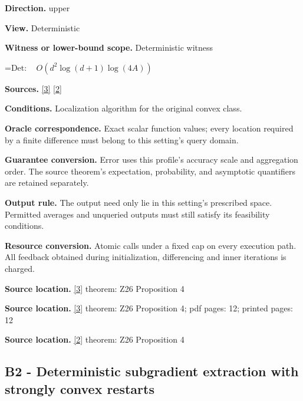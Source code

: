 \documentclass[10pt,a4paper]{article}
\newcommand{\AtlasMath}[1]{\par\begingroup\centering\setbox0=\hbox{$\displaystyle #1$}\ifdim\wd0>1.4\linewidth\typeout{ATLAS WIDE FORMULA: \the\wd0}\fi\ifdim\wd0>\linewidth\resizebox{\linewidth}{!}{\box0}\else\box0\fi\par\endgroup}
\begin{document}
\textbf{Direction.} upper



\textbf{View.} Deterministic



\textbf{Witness or lower-bound scope.} Deterministic witness



\AtlasMath{\mathrm{Det}:\quad O(d^2\log(d+1)\log(4A))}


\textbf{Sources.} \href{https://arxiv.org/html/2607.16558v2}{[3]} \href{https://www.mathnet.ru/php/archive.phtml?jrnid=mzm&option_lang=eng&paperid=1697&wshow=paper}{[2]}



\textbf{Conditions.} Localization algorithm for the original convex class.



\textbf{Oracle correspondence.} Exact scalar function values; every location required by a finite difference must belong to this setting's query domain.



\textbf{Guarantee conversion.} Error uses this profile's accuracy scale and aggregation order. The source theorem's expectation, probability, and asymptotic quantifiers are retained separately.



\textbf{Output rule.} The output need only lie in this setting's prescribed space. Permitted averages and unqueried outputs must still satisfy its feasibility conditions.



\textbf{Resource conversion.} Atomic calls under a fixed cap on every execution path. All feedback obtained during initialization, differencing and inner iterations is charged.



\textbf{Source location.} \href{https://arxiv.org/html/2607.16558v2}{[3]} theorem: Z26 Proposition 4



\textbf{Source location.} \href{https://arxiv.org/html/2607.16558v2}{[3]} theorem: Z26 Proposition 4; pdf pages: 12; printed pages: 12



\textbf{Source location.} \href{https://www.mathnet.ru/php/archive.phtml?jrnid=mzm&option_lang=eng&paperid=1697&wshow=paper}{[2]} theorem: Z26 Proposition 4



\subsection{B2 - Deterministic subgradient extraction with strongly convex restarts}
\end{document}

